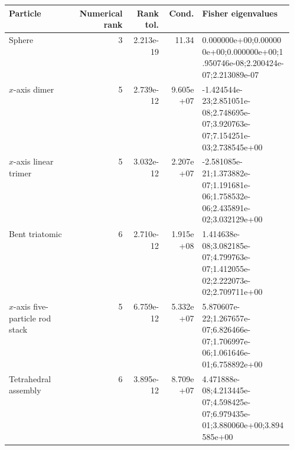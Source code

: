 \begin{tabular}{p{0.24\linewidth}rrrp{0.32\linewidth}}
\toprule
Particle & Numerical rank & Rank tol. & Cond. & Fisher eigenvalues \\
\midrule
Sphere & 3 & 2.213e-19 & 11.34 & 0.000000e+00;0.000000e+00;0.000000e+00;1.950746e-08;2.200424e-07;2.213089e-07 \\
$x$-axis dimer & 5 & 2.739e-12 & 9.605e+07 & -1.424544e-23;2.851051e-08;2.748695e-07;3.920763e-07;7.154251e-03;2.738545e+00 \\
$x$-axis linear trimer & 5 & 3.032e-12 & 2.207e+07 & -2.581085e-21;1.373882e-07;1.191681e-06;1.758532e-06;2.435891e-02;3.032129e+00 \\
Bent triatomic & 6 & 2.710e-12 & 1.915e+08 & 1.414638e-08;3.082185e-07;4.799763e-07;1.412055e-02;2.222073e-02;2.709711e+00 \\
$x$-axis five-particle rod stack & 5 & 6.759e-12 & 5.332e+07 & 5.870607e-22;1.267657e-07;6.826466e-07;1.706997e-06;1.061646e-01;6.758892e+00 \\
Tetrahedral assembly & 6 & 3.895e-12 & 8.709e+07 & 4.471888e-08;4.213445e-07;4.598425e-07;6.979435e-01;3.880060e+00;3.894585e+00 \\
\bottomrule
\end{tabular}
